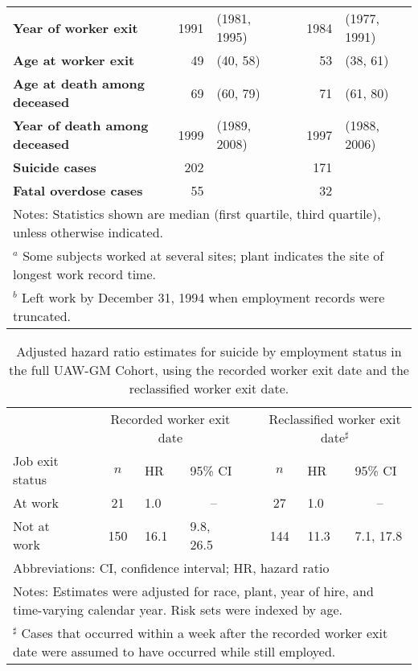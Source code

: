 \documentclass[10pt,]{article}
\begin{document}
\begin{table}[H]
\begin{tabular}{p{}rllrl}
  \textbf{Year of worker exit} & 1991 & (1981, 1995) &  & 1984 & (1977, 1991) \\ 
  \textbf{Age at worker exit} & 49 & (40, 58) &  & 53 & (38, 61) \\ 
  \textbf{Age at death among deceased} & 69 & (60, 79) &  & 71 & (61, 80) \\ 
  \textbf{Year of death among deceased} & 1999 & (1989, 2008) &  & 1997 & (1988, 2006) \\ 
  \textbf{Suicide cases} & 202 &  &  & 171 &  \\ 
  \textbf{Fatal overdose cases} & 55 &  &  & 32 &  \\ 
   \hline
\multicolumn{6}{p{0.7\textwidth}}{\footnotesize{Notes: Statistics shown are median (first quartile, third quartile), unless otherwise indicated.}} \\
\multicolumn{6}{p{0.7\textwidth}}{\footnotesize{$^a$ Some subjects worked at several sites; plant indicates the site of longest work record time.}} \\
\multicolumn{6}{p{0.7\textwidth}}{\footnotesize{$^b$ Left work by December 31, 1994 when employment records were truncated.}} \\ \bottomrule
\end{tabular}
\end{table}

\begin{table}[H]
\caption{Adjusted hazard ratio estimates for suicide by employment status in the full UAW-GM Cohort, using the recorded worker exit date and the reclassified worker exit date.}
\label{tab:tab2}
\centering
\begin{tabular}{lrcllrcll}
  \toprule
 &&\multicolumn{3}{p{2.55cm}}{Recorded worker exit date} &&\multicolumn{3}{p{2.55cm}}{Reclassified worker exit date$^\sharp$} \\ 
 \cline{3-5}\cline{7-9}Job exit status & \phantom{} & $n$ & HR & 95\% CI & \phantom{} & $n$ & HR & 95\% CI \\ 
  \midrule
At work &  & 21 & 1.0 & \multicolumn{1}{c}{--} &  & 27 & 1.0 & \multicolumn{1}{c}{--} \\ 
  Not at work &  & 150 & 16.1 & 9.8, 26.5 &  & 144 & 11.3 & 7.1, 17.8 \\ 
   \hline\multicolumn{9}{p{0.55\textwidth}}{\footnotesize{Abbreviations: CI, confidence interval; HR, hazard ratio}} \\\multicolumn{9}{p{0.55\textwidth}}{\footnotesize{Notes: Estimates were adjusted for race, plant, year of hire, and time-varying calendar year. Risk sets were indexed by age.}} \\\multicolumn{9}{p{0.55\textwidth}}{\footnotesize{$^\sharp$ Cases that occurred within a week after the recorded worker exit date were assumed to have occurred while still employed.}} \\ \bottomrule
\end{tabular}
\end{table}
\end{document}
